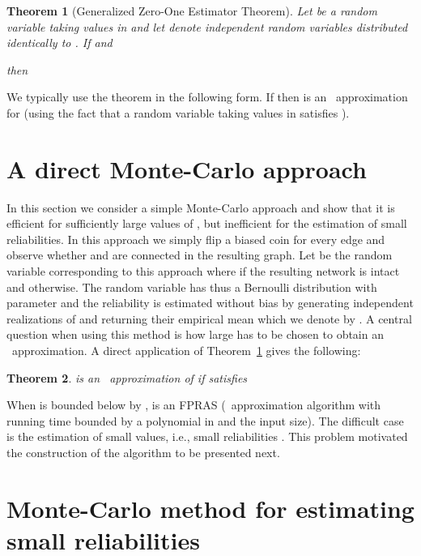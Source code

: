 \documentclass{article}
\newtheorem{theorem}{Theorem}
\begin{document}
\begin{theorem}[Generalized Zero-One Estimator Theorem]\label{thm:generalized_01_thm}
Let  be a random variable taking values in  and let
 denote independent random variables distributed
identically to . If
 and

then

\end{theorem}

We typically use the theorem in the following form. If
 then  is an
~approximation for  (using the fact
that a random variable  taking values in 
satisfies ).

\section{A direct Monte-Carlo approach}\label{sec:direct_montecarlo}

In this section we consider a simple \mbox{Monte-Carlo} approach and
show that it is efficient for sufficiently large values of
, but inefficient for the estimation of small
reliabilities.
In this approach we simply flip a biased coin for every edge 
and observe whether  and  are connected in the resulting graph. Let
 be the random variable corresponding to this approach
where  if the resulting network is intact and  otherwise.
The random variable  has thus a Bernoulli
distribution with parameter 
and the reliability is estimated without bias by 
generating  independent realizations of  and returning their
empirical mean which we denote by . 
A central question when using this method is how
large  has to be chosen to obtain an ~approximation.
A direct application of Theorem~\ref{thm:generalized_01_thm}
gives the following:

\begin{theorem}\label{thm:montecarlo_approx}
 is an ~approximation of
 if  satisfies

\end{theorem}

When  is bounded below by
,  is an FPRAS (~approximation algorithm
with running time bounded by a polynomial in  and the
input size). The difficult case is the estimation of small values, i.e.,
small reliabilities . This problem
motivated the construction of the algorithm to be presented next.

\section{Monte-Carlo method for estimating small reliabilities}\label{sec:our_algorithm}
\end{document}
